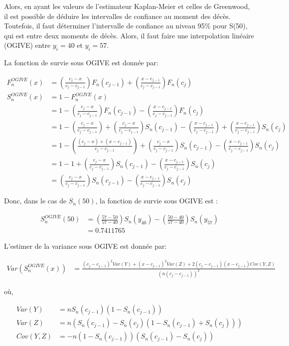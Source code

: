 \documentclass[]{article}
\begin{document}
Alors, en ayant les valeurs de l'estimateur Kaplan-Meier et celles de
Greenwood, il est possible de déduire les intervalles de confiance au
moment des décès. Toutefois, il faut déterminer l'intervalle de
confiance au niveau 95\% pour S(50), qui est entre deux moments de
décès. Alors, il faut faire une interpolation linéaire (OGIVE) entre
\(y_i = 40\) et \(y_i = 57\).

\newpage

La fonction de survie sous OGIVE est donnée par:

\begin{align*}
    F_n^{OGIVE}(x)
    &= (\frac{c_j-x}{c_j-c_{j-1}}) F_n(c_{j-1}) + (\frac{x-c_{j-1}}{c_j-c_{j-1}}) F_n(c_{j}) \\
    S_n^{OGIVE}(x)
    &= 1-F_n^{OGIVE}(x) \\
    &= 1- (\frac{c_j-x}{c_j-c_{j-1}}) F_n(c_{j-1}) - (\frac{x-c_{j-1}}{c_j-c_{j-1}}) F_n(c_{j}) \\
    &= 1 - (\frac{c_j-x}{c_j-c_{j-1}}) + (\frac{c_j-x}{c_j-c_{j-1}}) S_n(c_{j-1}) - (\frac{x-c_{j-1}}{c_j-c_{j-1}}) + (\frac{x-c_{j-1}}{c_j-c_{j-1}}) S_n(c_{j}) \\
    &= 1- (\frac{(c_j-x) + (x-c_{j-1})}{c_j-c_{j-1}}) + (\frac{c_j-x}{c_j-c_{j-1}}) S_n(c_{j-1}) - (\frac{x-c_{j-1}}{c_j-c_{j-1}}) S_n(c_{j}) \\
    &= 1-1+(\frac{c_j-x}{c_j-c_{j-1}}) S_n(c_{j-1}) - (\frac{x-c_{j-1}}{c_j-c_{j-1}}) S_n(c_{j}) \\
    &=(\frac{c_j-x}{c_j-c_{j-1}}) S_n(c_{j-1}) - (\frac{x-c_{j-1}}{c_j-c_{j-1}}) S_n(c_{j})
\end{align*}

Donc, dans le cas de \(S_n(50)\), la fonction de survie sous OGIVE est :

\begin{align*}
    S_n^{OGIVE}(50)
    &=(\frac{57-50}{57-40}) S_n(y_{40}) - (\frac{50-40}{57-40}) S_n(y_{57}) \\
    &= 0.7411765
\end{align*}

L'estimer de la variance sous OGIVE est donnée par:

\begin{align*}
    Var(S_n^{OGIVE}(x))
    &= \frac{(c_j-c_{j-1})^2Var(Y) + (x-c_{j-1})^2Var(Z) + 2(c_j-c_{j-1})(x-c_{j-1})Cov(Y,Z)}{(n(c_j-c_{j-1}))^2} 
\end{align*}

où,

\begin{align*}
    Var(Y)
    &= n S_n(c_{j-1}) (1 - S_n(c_{j-1})) \\
    Var(Z)
    &= n (S_n(c_{j-1}) - S_n(c_{j}) (1 - S_n(c_{j-1}) + S_n(c_{j}))) \\
    Cov(Y,Z)
    &= -n (1 - S_n(c_{j-1})) (S_n(c_{j-1}) - S_n(c_{j}))
\end{align*}
\end{document}
